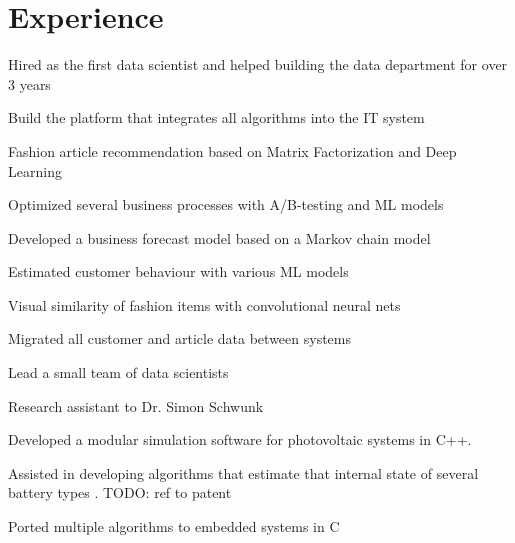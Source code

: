 \documentclass[]{deedy-resume-openfont}
\begin{document}
\begin{minipage}[t]{0.62\textwidth} 


\section{Experience}

\vspace{12pt} %
\begin{tightemize}
\item Hired as the first data scientist and helped building the data department for over 3 years
\item Build the platform that integrates all algorithms into the IT system
\item Fashion article recommendation based on Matrix Factorization and Deep Learning
\item Optimized several business processes with A/B-testing and ML models
\item Developed a business forecast model based on a Markov chain model
\item Estimated customer behaviour with various ML models
\item Visual similarity of fashion items with convolutional neural nets
\item Migrated all customer and article data between systems
\item Lead a small team of data scientists
\end{tightemize}
\sectionsep


\begin{tightemize}
\item Research assistant to Dr. Simon Schwunk
\item Developed a modular simulation software for photovoltaic systems in C++.
\item Assisted in developing algorithms that estimate that internal state of several battery types . TODO: ref to patent
\item Ported multiple algorithms to embedded systems in C
\end{tightemize}
\sectionsep



\end{minipage}
\end{document}
